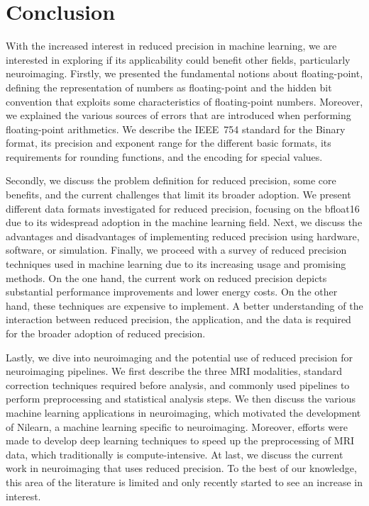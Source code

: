 \chapter{Conclusion}
\label{ch:conclusion}
With the increased interest in reduced precision in machine learning, we are interested
in exploring if its applicability could benefit other fields, particularly neuroimaging.
Firstly, we presented the fundamental notions about floating-point, defining the representation
of numbers as floating-point and the hidden bit convention that exploits some characteristics
of floating-point numbers.
Moreover, we explained the various sources of errors that are introduced when performing
floating-point arithmetics.
We describe the IEEE~754 standard for the Binary format, its precision and
exponent range for the different basic formats, its requirements
for rounding functions, and the encoding for special values.

Secondly, we discuss the problem definition for reduced precision, some core benefits,
and the current challenges that limit its broader adoption.
We present different data formats investigated for reduced precision, focusing on
the bfloat16 due to its widespread adoption in the machine learning field.
Next, we discuss the advantages and disadvantages of implementing reduced precision
using hardware, software, or simulation. 
Finally, we proceed with a survey of reduced precision techniques used in machine
learning due to its increasing usage and promising methods.
On the one hand, the current work on reduced precision depicts substantial
performance improvements and lower energy costs. 
On the other hand, these techniques are expensive to implement.
A better understanding of the interaction between reduced precision, the
application, and the data is required for the broader adoption of reduced precision.

Lastly, we dive into neuroimaging and the potential use of reduced precision for neuroimaging pipelines. We first describe the three MRI modalities, standard correction techniques required before analysis, and commonly used pipelines to perform preprocessing and statistical analysis steps. We then discuss the various machine learning applications in neuroimaging, which motivated the development of Nilearn, a machine learning specific to neuroimaging. Moreover, efforts were made to develop deep learning techniques to speed up the preprocessing of MRI data, which traditionally is compute-intensive. At last, we discuss the current work in neuroimaging that uses reduced precision. To the best of our knowledge, this area of the literature is limited and only recently started to see an increase in interest.

